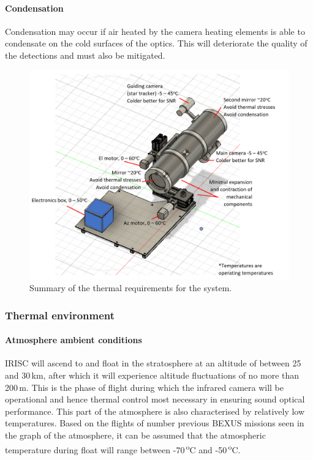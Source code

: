 \paragraph{Condensation}
Condensation may occur if air heated by the camera heating elements is able to condensate on the cold surfaces of the optics. This will deteriorate the quality of the detections and must also be mitigated.  \

	\begin{figure}[H]
    \centering
    \includegraphics[scale=0.8]{4-experiment-design/img/mechanical/thermalrequirements.PNG}
    	\caption{Summary of the thermal requirements for the system.}
	\label{fig:thermalrequirements}
	\end{figure}


















\subsubsection{Thermal environment}
\paragraph{Atmosphere ambient conditions}
IRISC will ascend to and float in the stratosphere at an altitude of between 25 and 30\,km, after which it will experience altitude fluctuations of no more than 200\,m. This is the phase of flight during which the infrared camera will be operational and hence thermal control most necessary in ensuring sound optical performance. This part of the atmosphere is also characterised by relatively low temperatures. Based on the flights of number previous BEXUS missions seen in the graph of the atmosphere, it can be assumed that the atmospheric temperature during float will range between -70\,\textsuperscript{o}C and -50\,\textsuperscript{o}C. \\

